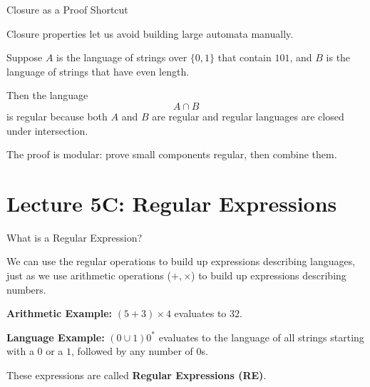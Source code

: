 \documentclass[10pt,aspectratio=169]{beamer}
\begin{document}
\begin{frame}{Closure as a Proof Shortcut}

Closure properties let us avoid building large automata manually.

\vspace{0.8em}
Suppose $A$ is the language of strings over $\{0,1\}$ that contain $101$, and $B$ is the language of strings that have even length.

\vspace{0.8em}
Then the language
\[
A \cap B
\]
is regular because both $A$ and $B$ are regular and regular languages are closed under intersection.

\vspace{0.8em}
The proof is modular: prove small components regular, then combine them.

\end{frame}

\section{Lecture 5C: Regular Expressions}

\begin{frame}{What is a Regular Expression?}

We can use the regular operations to build up expressions describing languages, just as we use arithmetic operations ($+, \times$) to build up expressions describing numbers.

\vspace{1em}

\textbf{Arithmetic Example:} $(5 + 3) \times 4$ evaluates to $32$.

\vspace{1em}

\textbf{Language Example:} $(0 \cup 1) 0^*$ evaluates to the language of all strings starting with a $0$ or a $1$, followed by any number of $0$s.

\vspace{1em}
\pause
These expressions are called \textbf{Regular Expressions (RE)}.

\end{frame}
\end{document}
